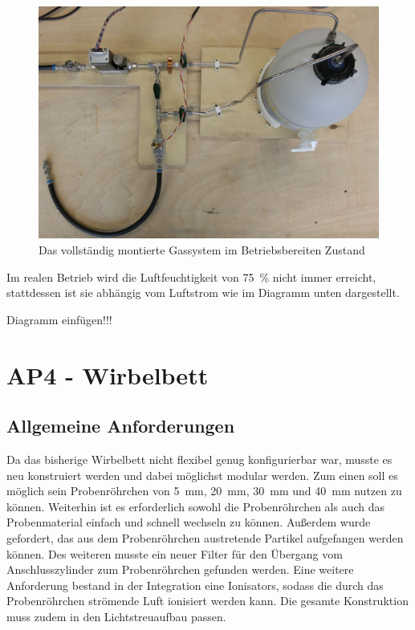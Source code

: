 \newpage

\begin{figure}[h!]
	\begin{center}
		\includegraphics[scale=0.11]{Gassystem_montiert.jpg}
		\caption[Gassystem montiert]{Das vollständig montierte Gassystem im Betriebsbereiten Zustand}
	\end{center}
\end{figure}


Im realen Betrieb wird die Luftfeuchtigkeit von \SI{75}{\%} nicht immer erreicht, stattdessen ist sie abhängig vom Luftstrom wie im Diagramm unten dargestellt.

Diagramm einfügen!!!

\newpage


\section{AP4 - Wirbelbett}


\subsection{Allgemeine Anforderungen}

Da das bisherige Wirbelbett nicht flexibel genug konfigurierbar war, musste es neu konstruiert werden und dabei möglichst modular werden. Zum einen soll es möglich sein Probenröhrchen von \SI{5}{mm}, \SI{20}{mm}, \SI{30}{mm} und \SI{40}{mm} nutzen zu können. Weiterhin ist es erforderlich sowohl die Probenröhrchen als auch das Probenmaterial einfach und schnell wechseln zu können. Außerdem wurde gefordert, das aus dem Probenröhrchen austretende Partikel aufgefangen werden können. Des weiteren musste ein neuer Filter für den Übergang vom Anschlusszylinder zum Probenröhrchen gefunden werden. 
Eine weitere Anforderung bestand in der Integration eine Ionisators, sodass die durch das Probenröhrchen strömende Luft ionisiert werden kann. Die gesamte Konstruktion muss zudem in den Lichtstreuaufbau passen. \\




